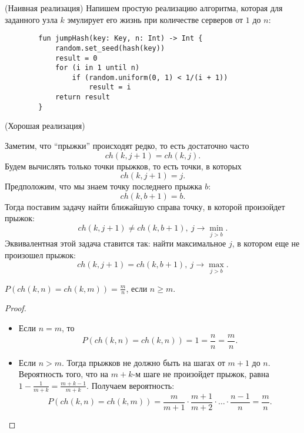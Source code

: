 \begin{algorithm}(Наивная реализация)
    Напишем простую реализацию алгоритма, которая для заданного узла
    $k$ эмулирует его жизнь при количестве серверов от $1$ до $n$:
    \begin{lstlisting}
        fun jumpHash(key: Key, n: Int) -> Int {
            random.set_seed(hash(key))
            result = 0
            for (i in 1 until n)
                if (random.uniform(0, 1) < 1/(i + 1))
                    result = i
            return result
        }
    \end{lstlisting}
\end{algorithm}

\begin{algorithm}(Хорошая реализация)
    
    Заметим, что ``прыжки'' происходят редко, то есть достаточно часто
    \[
        ch(k, j + 1) = ch(k, j)
    .\]
    Будем вычислять только точки прыжков, то есть точки, в которых
    \[
        ch(k, j + 1) = j
    .\]
    Предположим, что мы знаем точку последнего прыжка $b$:
    \[
        ch(k, b + 1) = b
    .\]
    Тогда поставим задачу найти ближайшую справа точку, в которой произойдет
    прыжок:
    \[
        ch(k, j + 1) \neq ch(k, b + 1),~ j \to \min_{j > b}
    .\]
    Эквивалентная этой задача ставится так: найти максимальное $j$, в котором
    еще не произошел прыжок:
    \[
        ch(k, j + 1) = ch(k, b + 1),~ j \to \max_{j > b}
    .\]
\end{algorithm}

\begin{lemma}
    $P(ch(k, n) = ch(k, m)) = \frac{m}{n}$, если $n \geqslant m$.
\end{lemma}
\begin{proof}
    \enewline
    \begin{itemize}
        \item Если $n = m$, то
            \[
                P(ch(k, n) = ch(k, n)) = 1 = \frac{n}{n} = \frac{m}{n}
            .\]
        \item Если $n > m$. Тогда прыжков не должно быть на шагах от
            $m + 1$ до $n$. Вероятность того, что на $m + k$-м шаге не произойдет
            прыжок, равна $1 - \frac{1}{m + k} = \frac{m + k - 1}{m + k}$.
            Получаем вероятность:
            \[
                P(ch(k, n) = ch(k, m)) = \frac{m}{m + 1} \cdot \frac{m + 1}{m + 2}
                \cdot \ldots \cdot \frac{n - 1}{n} = \frac{m}{n}
            .\]
    \end{itemize}
\end{proof}

